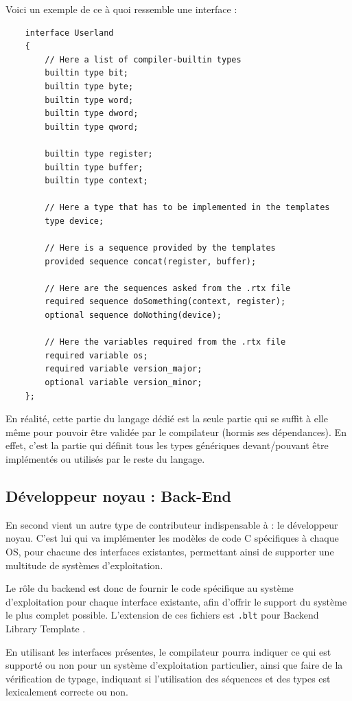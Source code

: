 \documentclass[french]{rtxreport}
\begin{document}
Voici un exemple de ce à quoi ressemble une interface :
\begin{lstlisting}
    interface Userland
    {
        // Here a list of compiler-builtin types
        builtin type bit;
        builtin type byte;
        builtin type word;
        builtin type dword;
        builtin type qword;

        builtin type register;
        builtin type buffer;
        builtin type context;

        // Here a type that has to be implemented in the templates
        type device;

        // Here is a sequence provided by the templates
        provided sequence concat(register, buffer);

        // Here are the sequences asked from the .rtx file
        required sequence doSomething(context, register);
        optional sequence doNothing(device);

        // Here the variables required from the .rtx file
        required variable os;
        required variable version_major;
        optional variable version_minor;
    };
\end{lstlisting}

En réalité, cette partie du langage dédié est la seule partie qui se suffit à
elle même pour pouvoir être validée par le compilateur (hormis ses
dépendances). En effet, c'est la partie qui définit tous les types génériques
devant/pouvant être implémentés ou utilisés par le reste du langage.

\subsection{Développeur noyau : Back-End}
\lstset{language=blt}

En second vient un autre type de contributeur indispensable à \rtx : le
développeur noyau. C'est lui qui va implémenter les modèles de code C
spécifiques à chaque OS, pour chacune des interfaces existantes, permettant
ainsi de supporter une multitude de systèmes d'exploitation.

Le rôle du backend est donc de fournir le code spécifique au système
d'exploitation pour chaque interface existante, afin d'offrir le support du
système le plus complet possible. L'extension de ces fichiers est \texttt{.blt}
pour Backend Library Template .

En utilisant les interfaces présentes, le compilateur pourra indiquer ce qui est
supporté ou non pour un système d'exploitation particulier, ainsi que faire de
la vérification de typage, indiquant si l'utilisation des séquences et des types
est lexicalement correcte ou non.
\end{document}
